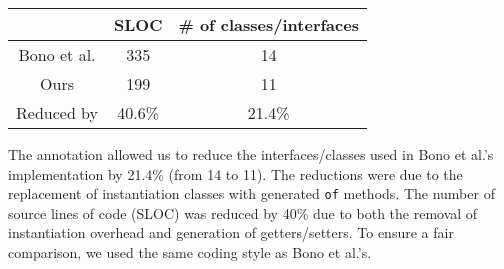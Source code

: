 \vspace{5pt}
\hspace{80pt}\begin{tabular}{ccc}
\hline
            & SLOC   & \# of classes/interfaces \\ \hline
Bono et al. & 335    & 14                       \\
Ours        & 199    & 11                       \\
\rowcolor[HTML]{C0C0C0} 
Reduced by  & 40.6\% & 21.4\%                   \\ \hline
\end{tabular}
\vspace{5pt}

\noindent The \mixin annotation allowed us to reduce the interfaces/classes used
in Bono et al.'s implementation by 21.4\% (from 14 to 11). The
reductions were due to the replacement of instantiation classes with
generated \texttt{of} methods. The number of source lines of code (SLOC)
was reduced by 40\% due to both the removal of instantiation overhead and
generation of getters/setters. %
To ensure a fair comparison, we used the same coding style as Bono et al.'s.
